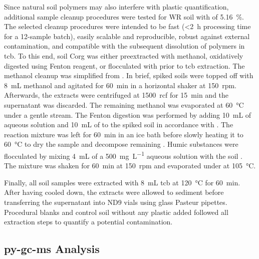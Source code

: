 Since natural soil polymers may also interfere with plastic quantification, additional sample cleanup procedures were tested for WR soil with  of \SI{5.16}{\percent}. The selected cleanup procedures were intended to be fast (\SI{<2}{\hour} processing time for a 12-sample batch), easily scalable and reproducible, robust against external contamination, and compatible with the subsequent dissolution of polymers in \ac{tcb}.
To this end, soil \ac{Corg} was either preextracted with methanol, oxidatively digested using Fenton reagent, or flocculated with  prior to \ac{tcb} extraction.
The methanol cleanup was simplified from \citet{FullerProcedure2016}. In brief, spiked soils were topped off with \SI{8}{\milli\liter} methanol and agitated for \SI{60}{\minute} in a horizontal shaker at \SI{150}{rpm}. Afterwards, the extracts were centrifuged at \SI{1500}{rcf} for \SI{15}{\minute} and the supernatant was discarded. The remaining methanol was evaporated at \SI{60}{\degreeCelsius} under a gentle  stream.
The Fenton digestion was performed by adding \SI{10}{\milli\liter} of aqueous  solution and \SI{10}{\milli\liter} of  to the spiked soil in accordance with \citet{HurleyValidation2018}. The reaction mixture was left for \SI{60}{\minute} in an ice bath before slowly heating it to \SI{60}{\degreeCelsius} to dry the sample and decompose remaining .
Humic substances were flocculated by mixing \SI{4}{\milli\liter} of a \SI{500}{\milli\gram\per\liter} aqueous  solution with the soil \citep{MandalakisSimple2018}. The mixture was shaken for \SI{60}{\minute} at \SI{150}{rpm} and evaporated under  at \SI{105}{\degreeCelsius}.

Finally, all soil samples were extracted with \SI{8}{\milli\liter} \ac{tcb} at \SI{120}{\degreeCelsius} for \SI{60}{\minute}. After having cooled down, the extracts were allowed to sediment before transferring the supernatant into ND9 vials using glass Pasteur pipettes. Procedural blanks and control soil without any plastic added followed all extraction steps to quantify a potential contamination.

\subsection{\Acs{py-gc-ms} Analysis}

